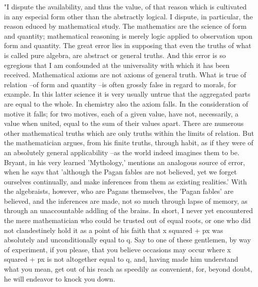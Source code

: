 \documentclass{article}
\begin{document}
"I dispute the availability, and thus the value, of that reason which is cultivated in any especial form other than the abstractly logical. I dispute, in particular, the reason educed by mathematical study. The mathematics are the science of form and quantity; mathematical reasoning is merely logic applied to observation upon form and quantity. The great error lies in supposing that even the truths of what is called pure algebra, are abstract or general truths. And this error is so egregious that I am confounded at the universality with which it has been received. Mathematical axioms are not axioms of general truth. What is true of relation --of form and quantity --is often grossly false in regard to morals, for example. In this latter science it is very usually untrue that the aggregated parts are equal to the whole. In chemistry also the axiom falls. In the consideration of motive it falls; for two motives, each of a given value, have not, necessarily, a value when united, equal to the sum of their values apart. There are numerous other mathematical truths which are only truths within the limits of relation. But the mathematician argues, from his finite truths, through habit, as if they were of an absolutely general applicability --as the world indeed imagines them to be. Bryant, in his very learned 'Mythology,' mentions an analogous source of error, when he says that 'although the Pagan fables are not believed, yet we forget ourselves continually, and make inferences from them as existing realities.' With the algebraists, however, who are Pagans themselves, the 'Pagan fables' are believed, and the inferences are made, not so much through lapse of memory, as through an unaccountable addling of the brains. In short, I never yet encountered the mere mathematician who could be trusted out of equal roots, or one who did not clandestinely hold it as a point of his faith that x squared + px was absolutely and unconditionally equal to q. Say to one of these gentlemen, by way of experiment, if you please, that you believe occasions may occur where x squared + px is not altogether equal to q, and, having made him understand what you mean, get out of his reach as speedily as convenient, for, beyond doubt, he will endeavor to knock you down.
\end{document}
